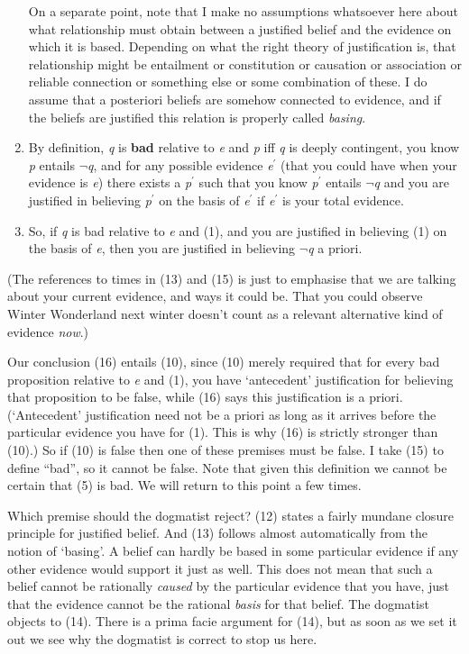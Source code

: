 \documentclass[
  11pt,
  letterpaper,
  DIV=11,
  numbers=noendperiod,
  oneside]{scrartcl}
\begin{document}
\begin{enumerate}
{    On a separate point, note that I make no assumptions whatsoever here
    about what relationship must obtain between a justified belief and
    the evidence on which it is based. Depending on what the right
    theory of justification is, that relationship might be entailment or
    constitution or causation or association or reliable connection or
    something else or some combination of these. I do assume that a
    posteriori beliefs are somehow connected to evidence, and if the
    beliefs are justified this relation is properly called
    \emph{basing}.}
\item
  By definition, \emph{q} is \textbf{bad} relative to \emph{e} and
  \emph{p} iff \emph{q} is deeply contingent, you know \emph{p} entails
  \(\neg\)\emph{q}, and for any possible evidence \emph{e}\(^\prime\)
  (that you could have when your evidence is \emph{e}) there exists a
  \emph{p}\(^\prime\) such that you know \emph{p}\(^\prime\) entails
  \(\neg\)\emph{q} and you are justified in believing
  \emph{p}\(^\prime\) on the basis of \emph{e}\(^\prime\) if
  \emph{e}\(^\prime\) is your total evidence.
\item
  So, if \emph{q} is bad relative to \emph{e} and (1), and you are
  justified in believing (1) on the basis of \emph{e}, then you are
  justified in believing \(\neg\)\emph{q} a priori.
\end{enumerate}

(The references to times in (13) and (15) is just to emphasise that we
are talking about your current evidence, and ways it could be. That you
could observe Winter Wonderland next winter doesn't count as a relevant
alternative kind of evidence \emph{now}.)

Our conclusion (16) entails (10), since (10) merely required that for
every bad proposition relative to \emph{e} and (1), you have
`antecedent' justification for believing that proposition to be false,
while (16) says this justification is a priori. (`Antecedent'
justification need not be a priori as long as it arrives before the
particular evidence you have for (1). This is why (16) is strictly
stronger than (10).) So if (10) is false then one of these premises must
be false. I take (15) to define ``bad'', so it cannot be false. Note
that given this definition we cannot be certain that (5) is bad. We will
return to this point a few times.

Which premise should the dogmatist reject? (12) states a fairly mundane
closure principle for justified belief. And (13) follows almost
automatically from the notion of `basing'. A belief can hardly be based
in some particular evidence if any other evidence would support it just
as well. This does not mean that such a belief cannot be rationally
\emph{caused} by the particular evidence that you have, just that the
evidence cannot be the rational \emph{basis} for that belief. The
dogmatist objects to (14). There is a prima facie argument for (14), but
as soon as we set it out we see why the dogmatist is correct to stop us
here.
\end{document}
